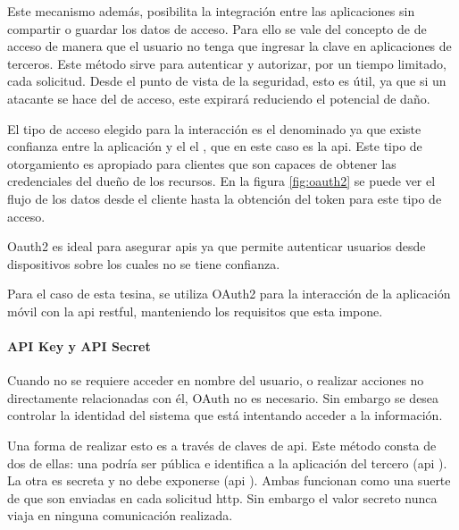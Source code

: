 Este mecanismo además, posibilita la integración entre las aplicaciones sin compartir o guardar los datos de acceso. Para ello se vale del concepto de  de acceso de manera que el usuario no tenga que ingresar la clave en aplicaciones de terceros. Este método sirve para autenticar y autorizar, por un tiempo limitado, cada solicitud. Desde el punto de vista de la seguridad, esto es útil, ya que si un atacante se hace del  de acceso, este expirará reduciendo el potencial de daño.

El tipo de acceso elegido para la interacción  es el denominado  ya que existe confianza entre la aplicación y el el , que en este caso es la \gls{api}. Este tipo de otorgamiento es apropiado para clientes que son capaces de obtener las credenciales del dueño de los recursos\cite{hardt2012oauth}.
En la figura \ref{fig:oauth2} se puede ver el flujo de los datos desde el cliente hasta la obtención del token para este tipo de acceso.


Oauth2 es ideal para asegurar \glspl{api} ya que permite autenticar usuarios desde dispositivos sobre los cuales no se tiene confianza\cite{degges2015ApiSecurity}. 

Para el caso de esta tesina, se utiliza OAuth2 para la interacción de la aplicación móvil con la \gls{api} \gls{restful}, manteniendo los requisitos que esta impone.

\paragraph{API Key y API Secret}
\label{apikey}
Cuando no se requiere acceder en nombre del usuario, o realizar acciones no directamente relacionadas con él, OAuth no es necesario. Sin embargo se desea controlar la identidad del sistema que está intentando acceder a la información. 

Una forma de realizar esto es a través de claves de \gls{api}. Este método consta de dos de ellas: una podría ser pública e identifica a la aplicación del tercero (\gls{api} ). La otra es secreta y no debe exponerse (\gls{api} ). Ambas funcionan como una suerte de  que son enviadas en cada solicitud \gls{http}. Sin embargo el valor secreto nunca viaja en ninguna comunicación realizada.

